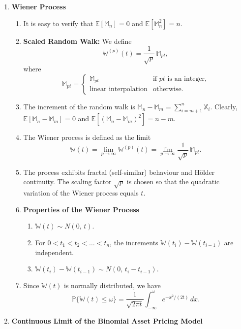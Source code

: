 \begin{enumerate}
    \item \textbf{Wiener Process}
    \begin{enumerate}
        \item It is easy to verify that $\mathbb{E}[\mathbb{M}_n] = 0$ and $\mathbb{E}[\mathbb{M}_n^2] = n$.
        \item \textbf{Scaled Random Walk:} We define
        \[\mathbb{W}^{(p)}(t) = \frac{1}{\sqrt{p}}\, \mathbb{M}_{pt},\]
        where
        \[\mathbb{M}_{pt} = \begin{cases}
            \mathbb{M}_{pt} & \text{if $pt$ is an integer,} \\
            \text{linear interpolation} & \text{otherwise.}
        \end{cases}\]
        \item The increment of the random walk is $\mathbb{M}_n - \mathbb{M}_m = \sum_{i=m+1}^{n} \mathbb{X}_i$.
        Clearly, $\mathbb{E}[\mathbb{M}_n - \mathbb{M}_m] = 0$ and $\mathbb{E}[(\mathbb{M}_n - \mathbb{M}_m)^2] = n - m$.
        \item The Wiener process is defined as the limit
        \[\mathbb{W}(t) = \lim_{p \to \infty} \mathbb{W}^{(p)}(t) = \lim_{p \to \infty} \frac{1}{\sqrt{p}}\, \mathbb{M}_{pt}.\]
        \item The process exhibits fractal (self-similar) behaviour and H\"{o}lder continuity. The
        scaling factor $\sqrt{p}$ is chosen so that the quadratic variation of the Wiener process
        equals $t$.
        \item \textbf{Properties of the Wiener Process}
        \begin{enumerate}
            \item $\mathbb{W}(t) \sim N(0,\, t)$.
            \item For $0 < t_1 < t_2 < \dots < t_n$, the increments $\mathbb{W}(t_i) - \mathbb{W}(t_{i-1})$ are independent.
            \item $\mathbb{W}(t_i) - \mathbb{W}(t_{i-1}) \sim N(0,\, t_i - t_{i-1})$.
        \end{enumerate}
        \item Since $\mathbb{W}(t)$ is normally distributed, we have
        \[\mathbb{P}\{\mathbb{W}(t) \leq \omega\} = \frac{1}{\sqrt{2\pi t}} \int_{-\infty}^{\omega} e^{-x^2/(2t)}\, dx.\]
    \end{enumerate}

    \item \textbf{Continuous Limit of the Binomial Asset Pricing Model}


\end{enumerate}
